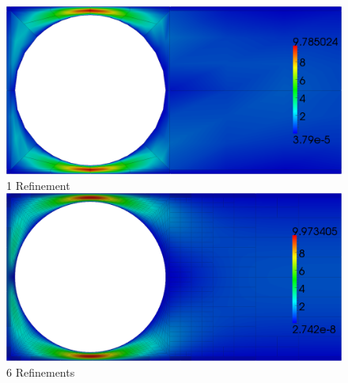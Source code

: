 \documentclass[18pt,xcolor=table]{beamer}
\begin{document}
\begin{frame}
\begin{columns}
\begin{column}{0.49\textwidth}
{\begin{figure}
Nonconservative
\end{figure}
\end{column}
\begin{column}{0.49\textwidth}
\begin{figure}
\centering
\includegraphics[width=1.0\textwidth]{StokesCylinder/umag9_C1.png}\\
\vspace{-1ex}
{\scriptsize 1 Refinement}\\
\vspace{1ex}
\includegraphics[width=1.0\textwidth]{StokesCylinder/umag9_C6.png}
\vspace{-1ex}
{\scriptsize 6 Refinements}
\vspace{1ex}


\end{figure}
\end{column}
\end{columns}
\end{frame}
\end{document}
